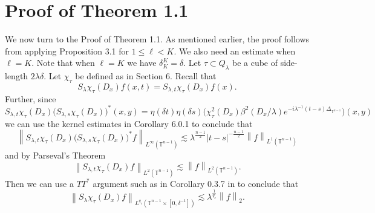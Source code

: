 \documentclass[11pt]{amsart}
\numberwithin{equation}{section}
\newcommand{\Tn}{\mathbb{T}^{n-1}}
\newcommand{\la}{\lambda}
\newcommand\norm[1]{\left\lVert#1\right\rVert}
\newcommand{\lpnorm}[3]{\norm{#1}_{L^{#2}(#3)}}
\newcommand{\altlpnorm}[2]{\norm{#1}_{#2}}
\newcommand{\laplac}[1]{\Delta_{#1}}
\newcommand{\Sl}{S_{\la}}
\newcommand{\dK}[1]{\delta_{K}^{#1}}
\begin{document}
\section{Proof of Theorem 1.1}
We now turn to the Proof of Theorem 1.1. As mentioned earlier, the proof follows from applying Proposition 3.1 for $1 \leq \ell < K$. We also need an estimate when $\ell = K$. Note that when $\ell = K$ we have $\dK{K} = \delta$. Let $\tau \subset Q_{\la}$ be a cube of side-length $2\la \delta$. Let $\chi_{\tau}$ be defined as in Section 6. Recall that 
\begin{equation}
    \Sl \chi_{\tau}(D_x)f(x, t) = S_{\la, t} \chi_{\tau}(D_x)f(x). 
\end{equation}
Further, since
\begin{equation}
    S_{\la, t} \chi_{\tau}(D_x) \big(S_{\la, s} \chi_{\tau}(D_x)\big)^{*}(x,y) = \eta(\delta t)\eta(\delta s)\big(\chi_{\tau}^2(D_x)\beta^{2}(D_x / \la)e^{-i \la^{-1}(t-s)\laplac{\Tn}}\big)(x,y)
\end{equation}
we can use the kernel estimates in Corollary 6.0.1 to conclude that
\begin{equation}
    \lpnorm{S_{\la, t}\chi_{\tau}(D_x) \big( S_{\la,s} \chi_{\tau}(D_x)\big)^{*} f}{\infty}{\Tn} \lesssim\la^{\frac{n-1}{2}}|t-s|^{-\frac{n-1}{2}}\lpnorm{f}{1}{\Tn}
\end{equation}
and by Parseval's Theorem
\begin{equation}
    \lpnorm{S_{\la, t}\chi_{\tau}(D_x)f}{2}{\Tn} \lesssim \lpnorm{f}{2}{\Tn}.
\end{equation}
Then we can use a $TT^{*}$ argument such as in Corollary 0.3.7 in \cite{SoggeFourierIntegrals} to conclude that
\begin{equation} \label{K scale estimate}
     \lpnorm{\Sl \chi_{\tau}(D_x)f}{q_c}{\Tn \times [0, \delta^{-1}]} \lesssim \la^{\frac{1}{q_c}}\altlpnorm{f}{2}.
\end{equation}
\end{document}
